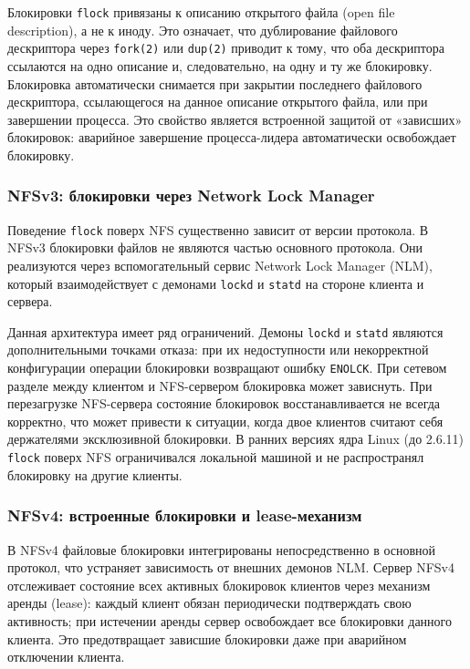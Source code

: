 Блокировки \texttt{flock} привязаны к описанию открытого файла (open file description), а не к иноду. Это означает, что дублирование файлового дескриптора через \texttt{fork(2)} или \texttt{dup(2)} приводит к тому, что оба дескриптора ссылаются на одно описание и, следовательно, на одну и ту же блокировку. Блокировка автоматически снимается при закрытии последнего файлового дескриптора, ссылающегося на данное описание открытого файла, или при завершении процесса. Это свойство является встроенной защитой от «зависших» блокировок: аварийное завершение процесса-лидера автоматически освобождает блокировку.

\subsubsection{NFSv3: блокировки через Network Lock Manager}

Поведение \texttt{flock} поверх NFS существенно зависит от версии протокола. В NFSv3 блокировки файлов не являются частью основного протокола. Они реализуются через вспомогательный сервис Network Lock Manager (NLM), который взаимодействует с демонами \texttt{lockd} и \texttt{statd} на стороне клиента и сервера.

Данная архитектура имеет ряд ограничений. Демоны \texttt{lockd} и \texttt{statd} являются дополнительными точками отказа: при их недоступности или некорректной конфигурации операции блокировки возвращают ошибку \texttt{ENOLCK}. При сетевом разделе между клиентом и NFS-сервером блокировка может зависнуть. При перезагрузке NFS-сервера состояние блокировок восстанавливается не всегда корректно, что может привести к ситуации, когда двое клиентов считают себя держателями эксклюзивной блокировки. В ранних версиях ядра Linux (до 2.6.11) \texttt{flock} поверх NFS ограничивался локальной машиной и не распространял блокировку на другие клиенты.

\subsubsection{NFSv4: встроенные блокировки и lease-механизм}

В NFSv4 файловые блокировки интегрированы непосредственно в основной протокол, что устраняет зависимость от внешних демонов NLM. Сервер NFSv4 отслеживает состояние всех активных блокировок клиентов через механизм аренды (lease): каждый клиент обязан периодически подтверждать свою активность; при истечении аренды сервер освобождает все блокировки данного клиента. Это предотвращает зависшие блокировки даже при аварийном отключении клиента.

